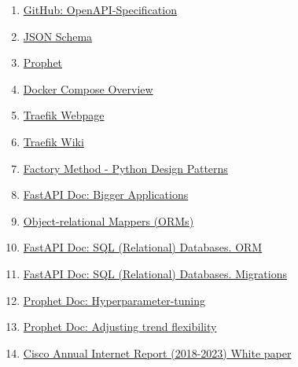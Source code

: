 \documentclass[a4paper, oneside, 12pt]{book}
\begin{document}
\begin{enumerate}
		\item
		\label{bib: openapi}
		\href{https://github.com/OAI/OpenAPI-Specification}{GitHub: OpenAPI-Specification}
		
		\item
		\label{bib: json schema}
		\href{https://json-schema.org/}{JSON Schema}
		
		\item
		\label{bib: prophet doc}
		\href{https://facebook.github.io/prophet/}{Prophet}
		
		\item
		\label{bib: docker compose doc}
		\href{https://docs.docker.com/compose/}{Docker Compose Overview}
		
		\item
		\label{bib: traefik webpage}
		\href{https://traefik.io/traefik/}{Traefik Webpage}
		
		\item
		\label{bib: traefik wiki}
		\href{https://doc.traefik.io/traefik/}{Traefik Wiki}
		
		\item
		\label{bib: factory method}
		\href{https://www.geeksforgeeks.org/factory-method-python-design-patterns/}{Factory Method - Python Design Patterns}
		
		\item
		\label{bib: fastapi doc bigger apps}
		\href{https://fastapi.tiangolo.com/tutorial/bigger-applications/}{FastAPI Doc: Bigger Applications}
		
		\item
		\label{bib: orm python}
		\href{https://www.fullstackpython.com/object-relational-mappers-orms.html}{Object-relational Mappers (ORMs)}
		
		\item
		\label{bib: fastapi orm}
		\href{https://fastapi.tiangolo.com/tutorial/sql-databases/#orms}{FastAPI Doc: SQL (Relational) Databases. ORM}
		
		\item
		\label{bib: fastapi migrations}
		\href{https://fastapi.tiangolo.com/tutorial/sql-databases/#migrations}{FastAPI Doc: SQL (Relational) Databases. Migrations}
		
		\item
		\label{bib: prophet parameters}
		\href{https://facebook.github.io/prophet/docs/diagnostics.html#hyperparameter-tuning}{Prophet Doc: Hyperparameter-tuning}
		
		\item
		\label{bib: prophet trend flex}
		\href{https://facebook.github.io/prophet/docs/trend_changepoints.html#adjusting-trend-flexibility}{Prophet Doc: Adjusting trend flexibility}
		
		\item
		\label{bib: cisco white paper}
		\href{https://www.cisco.com/c/en/us/solutions/collateral/executive-perspectives/annual-internet-report/white-paper-c11-741490.html}{Cisco Annual Internet Report (2018-2023) White paper}
		
		
	\end{enumerate}
\end{document}
